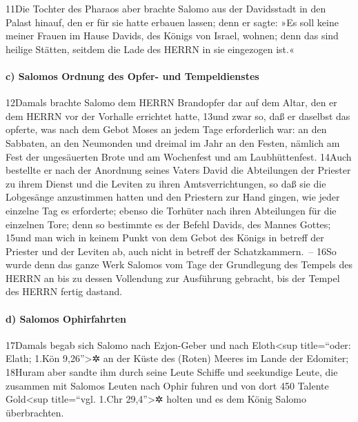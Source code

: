 11Die Tochter des Pharaos aber brachte Salomo aus der Davidsstadt in den
Palast hinauf, den er für sie hatte erbauen lassen; denn er sagte: »Es
soll keine meiner Frauen im Hause Davids, des Königs von Israel, wohnen;
denn das sind heilige Stätten, seitdem die Lade des HERRN in sie
eingezogen ist.«

\hypertarget{c-salomos-ordnung-des-opfer--und-tempeldienstes}{%
\paragraph{c) Salomos Ordnung des Opfer- und
Tempeldienstes}\label{c-salomos-ordnung-des-opfer--und-tempeldienstes}}

12Damals brachte Salomo dem HERRN Brandopfer dar auf dem Altar, den er
dem HERRN vor der Vorhalle errichtet hatte, 13und zwar so, daß er
daselbst das opferte, was nach dem Gebot Moses an jedem Tage
erforderlich war: an den Sabbaten, an den Neumonden und dreimal im Jahr
an den Festen, nämlich am Fest der ungesäuerten Brote und am Wochenfest
und am Laubhüttenfest. 14Auch bestellte er nach der Anordnung seines
Vaters David die Abteilungen der Priester zu ihrem Dienst und die
Leviten zu ihren Amtsverrichtungen, so daß sie die Lobgesänge
anzustimmen hatten und den Priestern zur Hand gingen, wie jeder einzelne
Tag es erforderte; ebenso die Torhüter nach ihren Abteilungen für die
einzelnen Tore; denn so bestimmte es der Befehl Davids, des Mannes
Gottes; 15und man wich in keinem Punkt von dem Gebot des Königs in
betreff der Priester und der Leviten ab, auch nicht in betreff der
Schatzkammern.~-- 16So wurde denn das ganze Werk Salomos vom Tage der
Grundlegung des Tempels des HERRN an bis zu dessen Vollendung zur
Ausführung gebracht, bis der Tempel des HERRN fertig dastand.

\hypertarget{d-salomos-ophirfahrten}{%
\paragraph{d) Salomos Ophirfahrten}\label{d-salomos-ophirfahrten}}

17Damals begab sich Salomo nach Ezjon-Geber und nach Eloth\textless sup
title=``oder: Elath; 1.Kön 9,26''\textgreater✲ an der Küste des (Roten)
Meeres im Lande der Edomiter; 18Huram aber sandte ihm durch seine Leute
Schiffe und seekundige Leute, die zusammen mit Salomos Leuten nach Ophir
fuhren und von dort 450 Talente Gold\textless sup title=``vgl. 1.Chr
29,4''\textgreater✲ holten und es dem König Salomo überbrachten.

